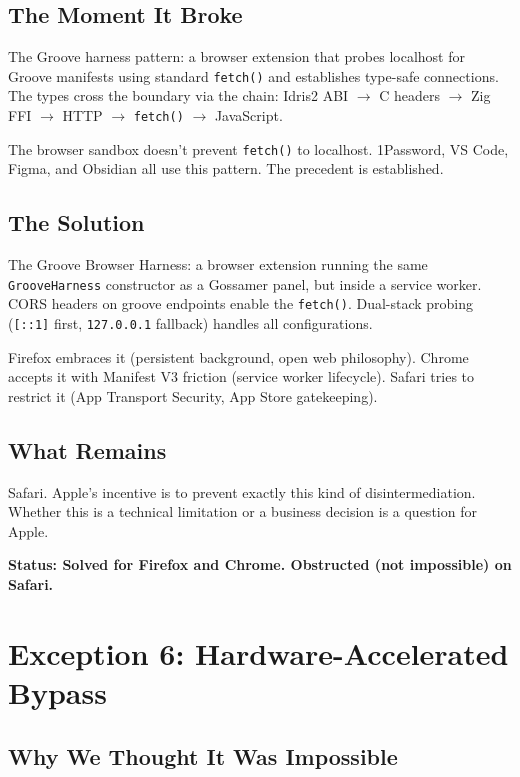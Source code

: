\documentclass[11pt,a4paper]{article}
\begin{document}
\subsection{The Moment It Broke}

The Groove harness pattern: a browser extension that probes localhost
for Groove manifests using standard \texttt{fetch()} and establishes
type-safe connections. The types cross the boundary via the chain:
Idris2 ABI $\rightarrow$ C headers $\rightarrow$ Zig FFI $\rightarrow$
HTTP $\rightarrow$ \texttt{fetch()} $\rightarrow$ JavaScript.

The browser sandbox doesn't prevent \texttt{fetch()} to localhost.
1Password, VS Code, Figma, and Obsidian all use this pattern. The
precedent is established.

\subsection{The Solution}

The Groove Browser Harness: a browser extension running the same
\texttt{GrooveHarness} constructor as a Gossamer panel, but inside a
service worker. CORS headers on groove endpoints enable the
\texttt{fetch()}. Dual-stack probing (\texttt{[::1]} first,
\texttt{127.0.0.1} fallback) handles all configurations.

Firefox embraces it (persistent background, open web philosophy).
Chrome accepts it with Manifest V3 friction (service worker lifecycle).
Safari tries to restrict it (App Transport Security, App Store
gatekeeping).

\subsection{What Remains}

Safari. Apple's incentive is to prevent exactly this kind of
disintermediation. Whether this is a technical limitation or a business
decision is a question for Apple.

\textbf{Status: Solved for Firefox and Chrome. Obstructed (not
impossible) on Safari.}

\section{Exception 6: Hardware-Accelerated Bypass}
\label{sec:hwbypass}

\subsection{Why We Thought It Was Impossible}
\end{document}
